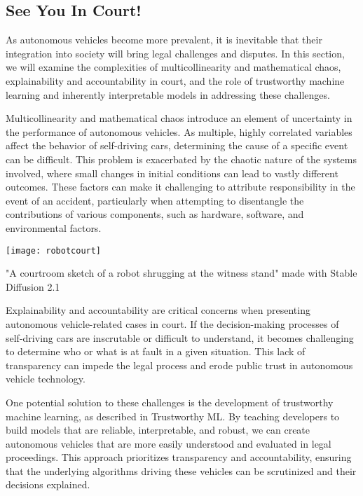 \begin{pdf}
\begin{pdf}
\section{See You In Court!}

As autonomous vehicles become more prevalent, it is inevitable that their integration into society will bring legal challenges and disputes. In this section, we will examine the complexities of multicollinearity and mathematical chaos, explainability and accountability in court, and the role of trustworthy machine learning and inherently interpretable models in addressing these challenges.

Multicollinearity and mathematical chaos introduce an element of uncertainty in the performance of autonomous vehicles. As multiple, highly correlated variables affect the behavior of self-driving cars, determining the cause of a specific event can be difficult. This problem is exacerbated by the chaotic nature of the systems involved, where small changes in initial conditions can lead to vastly different outcomes. These factors can make it challenging to attribute responsibility in the event of an accident, particularly when attempting to disentangle the contributions of various components, such as hardware, software, and environmental factors.

\begin{pdf}
\begin{marginfigure}[-5.5cm]
        \texttt{[image: robotcourt]}
        \caption{"A courtroom sketch of a robot shrugging at the witness stand" made with Stable Diffusion 2.1}
\end{marginfigure}
\end{pdf}

Explainability and accountability are critical concerns when presenting autonomous vehicle-related cases in court. If the decision-making processes of self-driving cars are inscrutable or difficult to understand, it becomes challenging to determine who or what is at fault in a given situation. This lack of transparency can impede the legal process and erode public trust in autonomous vehicle technology.

One potential solution to these challenges is the development of trustworthy machine learning, as described in Trustworthy ML. By teaching developers to build models that are reliable, interpretable, and robust, we can create autonomous vehicles that are more easily understood and evaluated in legal proceedings. This approach prioritizes transparency and accountability, ensuring that the underlying algorithms driving these vehicles can be scrutinized and their decisions explained. 


\end{pdf}
\end{pdf}
